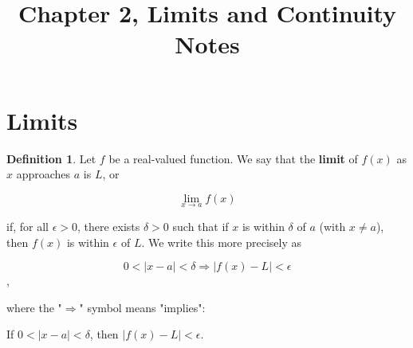 \documentclass{article}
\title{Chapter 2, Limits and Continuity Notes}
\theoremstyle{definition}
\newtheorem{definition}{Definition}[section]
\begin{document}
\maketitle
\section{Limits}
\begin{definition}
    Let $f$ be a real-valued function. We say that the \textbf{limit} of $f(x)$ as $x$ approaches $a$ is $L$, or
    \begin{center}
        \[ \lim_{x \to a} f(x) \]
    \end{center}
    if, for all $\epsilon > 0$, there exists $\delta > 0$ such that if $x$ is within $\delta$
    of $a$ (with $x \neq a$), then $f(x)$ is within $\epsilon$ of $L$. We write this more
    precisely as
    \begin{center}
        \[ 0 < |x - a| < \delta \Rightarrow |f(x) - L| < \epsilon\],
    \end{center}
    where the "$\Rightarrow$" symbol means "implies":
    \begin{center}
        If $0 < |x - a| < \delta$, then $|f(x) - L| < \epsilon$.
    \end{center}
\end{definition}
\end{document}
